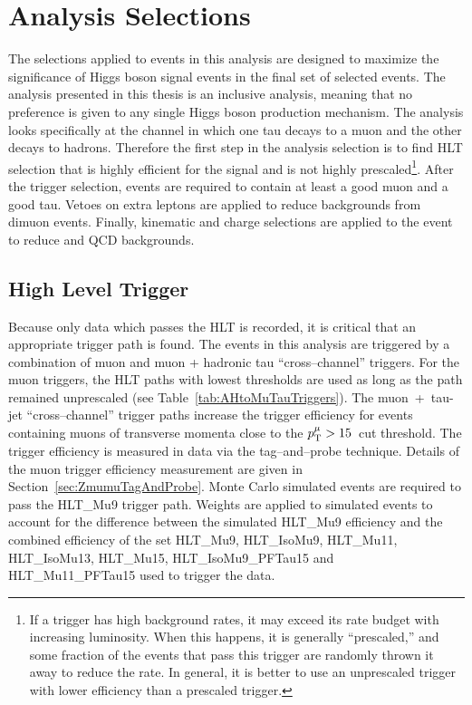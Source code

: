 \ifx\master\undefined\fi
%
\chapter{Analysis Selections} \label{ch:selections}
%
The selections applied to events in this analysis are designed to maximize the
significance of Higgs boson signal events in the final set of selected events.
The analysis presented in this thesis is an inclusive analysis, meaning that no
preference is given to any single Higgs boson production mechanism.  The
analysis looks specifically at the channel in which one tau decays to a muon and
the other decays to hadrons.  Therefore the first step in the analysis selection
is to find HLT selection that is highly efficient for the signal
and is not highly prescaled\footnote{If a trigger has high background rates, it
may exceed its rate budget with increasing luminosity.  When this happens, it is
generally ``prescaled,'' and some fraction of the events that pass this trigger
are randomly thrown it away to reduce the rate.  In general, it is better to use
an unprescaled trigger with lower efficiency than a prescaled trigger.}.  After
the trigger selection, events are required to contain at least a good muon and a
good tau.  Vetoes on extra leptons are applied to reduce backgrounds from
dimuon events.  Finally, kinematic and charge selections are applied to
the event to reduce \WpJets and QCD backgrounds.

\section{High Level Trigger}
Because only data which passes the HLT is recorded, it is critical that an
appropriate trigger path is found. The events in this analysis are
triggered by a combination of muon and muon + hadronic tau ``cross--channel''
triggers. For the muon triggers, the HLT paths with lowest \pt thresholds are used as
long as the path remained unprescaled (see Table~\ref{tab:AHtoMuTauTriggers}).
The \mbox{muon + tau-jet} ``cross--channel'' trigger paths increase the trigger
efficiency for events containing muons of transverse momenta close to the
$p_{\mathrm{T}}^{\mu} > 15$~\GeVc cut threshold.  The trigger efficiency is measured in
data via the tag--and--probe technique. Details of the muon trigger efficiency
measurement are given in Section~\ref{sec:ZmumuTagAndProbe}.  Monte Carlo
simulated events are required to pass the HLT\_Mu9 trigger path. Weights are
applied to simulated events to account for the difference between the simulated
HLT\_Mu9 efficiency and the combined efficiency of the set HLT\_Mu9,
HLT\_IsoMu9, HLT\_Mu11, HLT\_IsoMu13, HLT\_Mu15, HLT\_IsoMu9\_PFTau15 and
HLT\_Mu11\_PFTau15 used to trigger the data.

